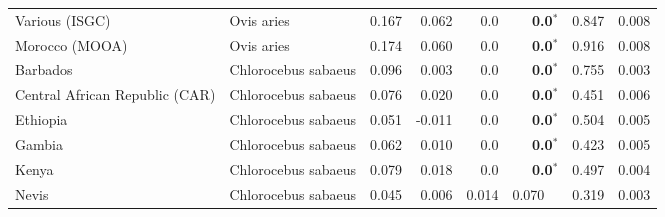 \begin{center}
\begin{adjustbox}{width = 1\textwidth}
\begin{tabular}{|l|l|r|r|r|r|r|r|}
                 Various (ISGC) &           Ovis aries &                                              0.167 &                                              0.062 &              0.0 &                    \textbf{0.0}$\bm{^*}$ &                                              0.847 &              0.008 \\
                 Morocco (MOOA) &           Ovis aries &                                              0.174 &                                              0.060 &              0.0 &                    \textbf{0.0}$\bm{^*}$ &                                              0.916 &              0.008 \\
                       Barbados &  Chlorocebus sabaeus &                                              0.096 &                                              0.003 &              0.0 &                    \textbf{0.0}$\bm{^*}$ &                                              0.755 &              0.003 \\
 Central African Republic (CAR) &  Chlorocebus sabaeus &                                              0.076 &                                              0.020 &              0.0 &                    \textbf{0.0}$\bm{^*}$ &                                              0.451 &              0.006 \\
                       Ethiopia &  Chlorocebus sabaeus &                                              0.051 &                                             -0.011 &              0.0 &                    \textbf{0.0}$\bm{^*}$ &                                              0.504 &              0.005 \\
                         Gambia &  Chlorocebus sabaeus &                                              0.062 &                                              0.010 &              0.0 &                    \textbf{0.0}$\bm{^*}$ &                                              0.423 &              0.005 \\
                          Kenya &  Chlorocebus sabaeus &                                              0.079 &                                              0.018 &              0.0 &                    \textbf{0.0}$\bm{^*}$ &                                              0.497 &              0.004 \\
                          Nevis &  Chlorocebus sabaeus &                                              0.045 &                                              0.006 &            0.014 &                         0.070~~ &                                              0.319 &              0.003 \\

\end{tabular}
\end{adjustbox}
\end{center}
